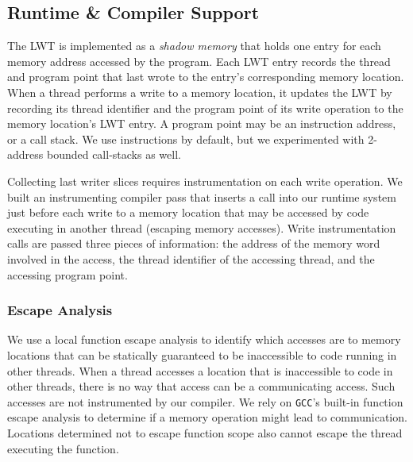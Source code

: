 \documentclass[preprint,9pt]{sigplanconf}
\newcommand{\lwt}{LWT\xspace}
\begin{document}

\subsection{Runtime \& Compiler Support}
 The \lwt is implemented as a {\em shadow memory} that holds one entry for
each memory address accessed by the program.  Each \lwt entry records the
thread and program point that last wrote to the entry's corresponding memory
location.  When a thread performs a write to a memory location, it updates the
\lwt by recording its thread identifier and the program point of its write
operation to the memory location's \lwt entry.  A program point may be an
instruction address, or a call stack.  We use instructions by default, but we experimented with 2-address bounded call-stacks as well.   

Collecting last writer slices requires instrumentation on each write operation.
We built an instrumenting compiler pass that inserts a call into our runtime
system just before each write to a memory location that may be accessed by code
executing in another thread (escaping memory accesses).  Write instrumentation
calls are passed three pieces of information: the address of the memory word
involved in the access, the thread identifier of the accessing thread, and the
accessing program point.   

\subsubsection{Escape Analysis}
We use a local function escape analysis to identify which accesses are to
memory locations that can be statically guaranteed to be inaccessible to code
running in other threads.  When a thread accesses a location that is
inaccessible to code in other threads, there is no way that access can be a
communicating access.  Such accesses are not instrumented by our compiler.  
We rely on {\tt GCC}'s built-in function escape analysis to determine if a
memory operation might lead to communication.  Locations determined not to
escape function scope also cannot escape the thread executing the function.
\end{document}
